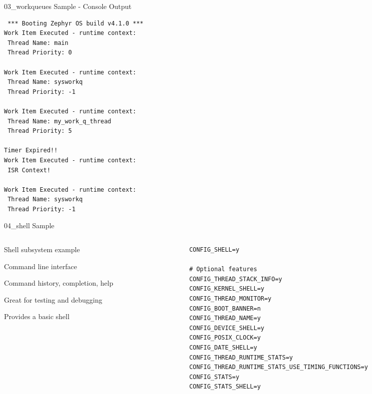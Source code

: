 \documentclass[10pt, aspectratio=169]{beamer}
\begin{document}
\begin{frame}[fragile]{03\_workqueues Sample - Console Output}
  \begin{listing}[H]
    \begin{verbatim}
 *** Booting Zephyr OS build v4.1.0 ***
Work Item Executed - runtime context:
 Thread Name: main
 Thread Priority: 0

Work Item Executed - runtime context:
 Thread Name: sysworkq
 Thread Priority: -1

Work Item Executed - runtime context:
 Thread Name: my_work_q_thread
 Thread Priority: 5

Timer Expired!!
Work Item Executed - runtime context:
 ISR Context!

Work Item Executed - runtime context:
 Thread Name: sysworkq
 Thread Priority: -1
    \end{verbatim}
  \end{listing}
\end{frame}
\begin{frame}[fragile]{04\_shell Sample}
  \begin{columns}
    \begin{column}{0.6\textwidth}
      \begin{description}
	\item [Description] Shell subsystem example\footnotemark
	\item [Shell] Command line interface
	\item Command history, completion, help
	\item Great for testing and debugging
	\item [Sample] Provides a basic shell
      \end{description}
    \end{column}
    \begin{column}{0.4\textwidth}
        {\fontsize{6}{6}\selectfont
  \begin{listing}[H]
    \begin{verbatim}
CONFIG_SHELL=y

# Optional features
CONFIG_THREAD_STACK_INFO=y
CONFIG_KERNEL_SHELL=y
CONFIG_THREAD_MONITOR=y
CONFIG_BOOT_BANNER=n
CONFIG_THREAD_NAME=y
CONFIG_DEVICE_SHELL=y
CONFIG_POSIX_CLOCK=y
CONFIG_DATE_SHELL=y
CONFIG_THREAD_RUNTIME_STATS=y
CONFIG_THREAD_RUNTIME_STATS_USE_TIMING_FUNCTIONS=y
CONFIG_STATS=y
CONFIG_STATS_SHELL=y
    \end{verbatim}
    \caption{\scriptsize{Excerpt from samples/04\_shell/prj.conf}}
  \end{listing}
        }
    \end{column}
  \end{columns}
\end{frame}
\end{document}
